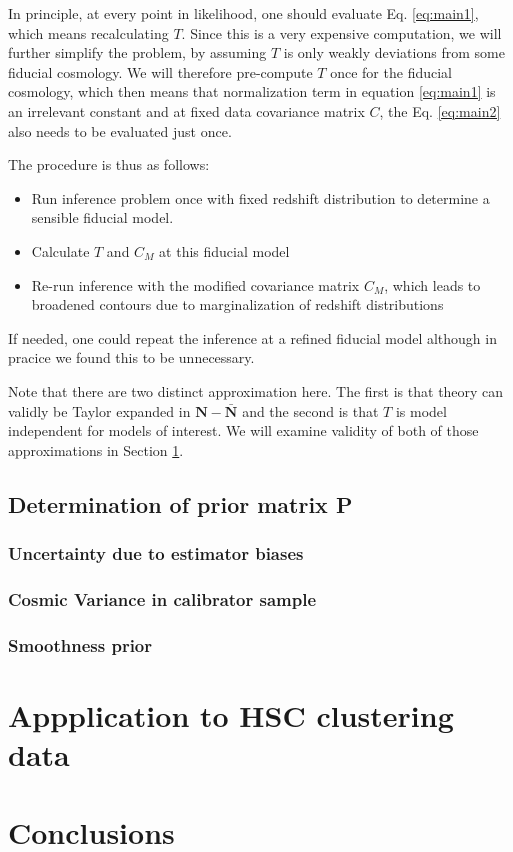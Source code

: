 \documentclass[a4paper,11pt]{article}
\newcommand{\vN}{\mathbf{N}}
\begin{document}
  In principle, at every point in likelihood, one should evaluate Eq. \ref{eq:main1}, which means recalculating $T$. Since this is a very expensive computation, we will further simplify the problem, by assuming $T$ is only weakly deviations from some fiducial cosmology. We will therefore pre-compute $T$ once for the fiducial cosmology, which then means that normalization term in equation \ref{eq:main1} is an irrelevant constant and at fixed data covariance matrix $C$, the Eq. \ref{eq:main2} also needs to be evaluated just once.

  The procedure is thus as follows:
  \begin{itemize}
  \item Run inference problem once with fixed redshift distribution to determine a sensible fiducial model.
    
  \item Calculate $T$ and $C_M$ at this fiducial model
    
  \item Re-run inference with the modified covariance matrix $C_M$, which leads to broadened contours due to marginalization of redshift distributions
    
  \end{itemize}
If needed, one could repeat the inference at a refined fiducial model although in pracice we found this to be unnecessary.

Note that there are two distinct approximation here. The first is that theory can validly be Taylor expanded in $\vN-\bar{\vN}$ and the second is that $T$ is model independent for models of interest. We will examine validity of both of those approximations in Section \ref{sec:hsc}.

\subsection{Determination of prior matrix P}

\subsubsection{Uncertainty due to estimator biases}

\subsubsection{Cosmic Variance in calibrator sample}

\subsubsection{Smoothness prior}


  





\section{Appplication to HSC clustering data}
\label{sec:hsc}



\section{Conclusions}



\end{document}
